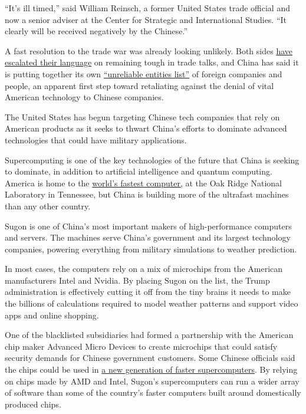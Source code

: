 ``It's ill timed,'' said William Reinsch, a former United States trade
official and now a senior adviser at the Center for Strategic and
International Studies. ``It clearly will be received negatively by the
Chinese.''

A fast resolution to the trade war was already looking unlikely. Both
sides
\href{https://www.nytimes.com/2019/06/02/business/china-trump-trade-fedex.html}{have
escalated their language} on remaining tough in trade talks, and China
has said it is putting together its own
\href{https://www.nytimes.com/2019/05/31/business/china-list-us-huawei-retaliate.html}{``unreliable
entities list''} of foreign companies and people, an apparent first step
toward retaliating against the denial of vital American technology to
Chinese companies.

The United States has begun targeting Chinese tech companies that rely
on American products as it seeks to thwart China's efforts to dominate
advanced technologies that could have military applications.

Supercomputing is one of the key technologies of the future that China
is seeking to dominate, in addition to artificial intelligence and
quantum computing. America is home to the
\href{https://www.nytimes.com/2018/06/08/technology/supercomputer-china-us.html}{world's
fastest computer,} at the Oak Ridge National Laboratory in Tennessee,
but China is building more of the ultrafast machines than any other
country.

Sugon is one of China's most important makers of high-performance
computers and servers. The machines serve China's government and its
largest technology companies, powering everything from military
simulations to weather prediction.

In most cases, the computers rely on a mix of microchips from the
American manufacturers Intel and Nvidia. By placing Sugon on the list,
the Trump administration is effectively cutting it off from the tiny
brains it needs to make the billions of calculations required to model
weather patterns and support video apps and online shopping.

One of the blacklisted subsidiaries had formed a partnership with the
American chip maker Advanced Micro Devices to create microchips that
could satisfy security demands for Chinese government customers. Some
Chinese officials said the chips could be used in
\href{https://www.nytimes.com/2017/11/07/business/made-in-china-technology-trade.html}{a
new generation of faster supercomputers}. By relying on chips made by
AMD and Intel, Sugon's supercomputers can run a wider array of software
than some of the country's faster computers built around domestically
produced chips.

